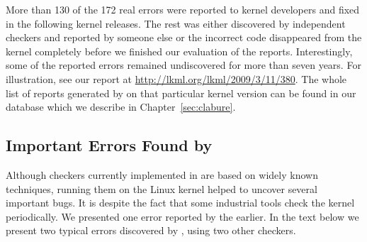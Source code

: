 More than 130 of the 172 real errors were reported to kernel developers and
fixed in the following kernel releases. The rest was either discovered by
independent checkers and reported by someone else or the incorrect code
disappeared from the kernel completely before we finished our evaluation of
the reports. Interestingly, some of the reported errors remained undiscovered
for more than seven years. For illustration, see our report at
\url{http://lkml.org/lkml/2009/3/11/380}. The whole list of reports generated
by \stan on that particular kernel version can be found in our database which
we describe in Chapter~\ref{sec:clabure}.

\subsection{Important Errors Found by \stan}\label{sec:stan_imp_errors}
Although checkers currently implemented in \stan are based on widely known
techniques, running them on the Linux kernel helped to uncover several
important bugs. It is despite the fact that some industrial tools check the
kernel periodically. We presented one error reported by the \RC earlier. In
the text below we present two typical errors discovered by \stan, using two
other checkers.

